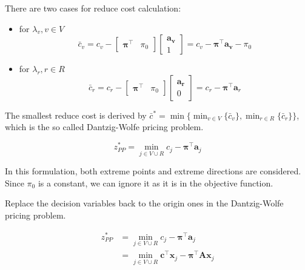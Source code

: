             There are two cases for reduce cost calculation:
            \begin{itemize}
                \item for $\lambda_v, v \in V$
                \begin{equation*}
                    \bar{c}_v = c_v - \begin{bmatrix}\mathbf{\pi}^\top & \pi_0\end{bmatrix} \begin{bmatrix}\mathbf{a_v} \\ 1\end{bmatrix} = c_v - \mathbf{\pi}^\top \mathbf{a_v} - \pi_0
                \end{equation*}
                \item for $\lambda_r, r \in R$
                \begin{equation*}
                    \bar{c}_r = c_r - \begin{bmatrix}\mathbf{\pi}^\top & \pi_0\end{bmatrix}\begin{bmatrix}\mathbf{a_r} \\ 0\end{bmatrix} = c_r - \mathbf{\pi}^\top \mathbf{a}_r
                \end{equation*}
            \end{itemize}

            The smallest reduce cost is derived by $\bar{c}^* = \min \{\min_{v \in V}\{\bar{c}_v\}, \min_{r \in R} \{\bar{c}_r\}\}$, which is the so called Dantzig-Wolfe pricing problem.

            \begin{equation*}
                z_{PP}^* = \min_{j \in V \cup R} c_j - \mathbf{\pi}^\top \mathbf{a}_j
            \end{equation*}

            In this formulation, both extreme points and extreme directions are considered. Since $\pi_0$ is a constant, we can ignore it as it is in the objective function.

            Replace the decision variables back to the origin ones in the Dantzig-Wolfe pricing problem. 

            \begin{align*}
                z_{PP}^* &= \min_{j \in V \cup R} c_j - \mathbf{\pi}^\top \mathbf{a}_j\\
                & = \min_{j \in V \cup R} \mathbf{c^\top x}_j - \mathbf{\pi^\top A x}_j\\
            \end{align*}

